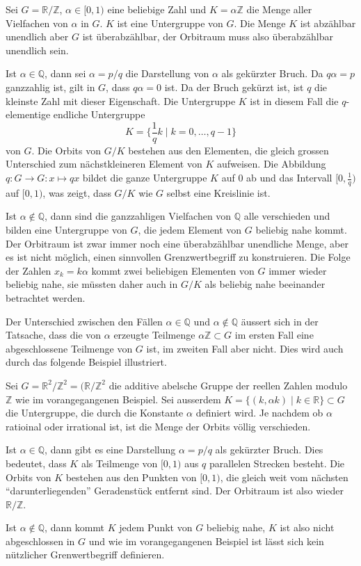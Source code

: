 \begin{beispiel}
Sei $G=\mathbb{R}/\mathbb{Z}$,
$\alpha\in [0,1)$ eine beliebige Zahl und $K=\alpha\mathbb{Z}$
die Menge aller Vielfachen von $\alpha$ in $G$.
$K$ ist eine Untergruppe von $G$.
Die Menge $K$ ist abzählbar unendlich aber $G$ ist überabzählbar,
der Orbitraum muss also überabzählbar unendlich sein.

Ist $\alpha\in\mathbb{Q}$, dann sei $\alpha=p/q$ die Darstellung
von $\alpha$ als gekürzter Bruch.
Da $q\alpha=p$ ganzzahlig ist, gilt in $G$, dass $q\alpha=0$ ist.
Da der Bruch gekürzt ist, ist $q$ die kleinste Zahl mit dieser
Eigenschaft.
Die Untergruppe $K$ ist in diesem Fall die $q$-elementige endliche
Untergruppe
\[
K = \biggl\{ \frac1qk \;\bigg|\; k=0,\dots,q-1 \biggr\}
\]
von $G$.
Die Orbits von $G/K$ bestehen aus den Elementen, die gleich grossen
Unterschied zum nächstkleineren Element von $K$ aufweisen.
Die Abbildung $q\colon G \to G: x\mapsto qx$ bildet die ganze
Untergruppe $K$ auf $0$ ab und das Intervall $[0,\frac1q)$ auf
$[0,1)$, was zeigt, dass $G/K$ wie $G$ selbst eine Kreislinie ist.

Ist $\alpha\not\in \mathbb{Q}$, dann sind die ganzzahligen Vielfachen
von $\mathbb{Q}$ alle verschieden und bilden eine Untergruppe von $G$,
die jedem Element von $G$ beliebig nahe kommt.
Der Orbitraum ist zwar immer noch eine überabzählbar unendliche
Menge, aber es ist nicht möglich, einen sinnvollen Grenzwertbegriff
zu konstruieren.
Die Folge der Zahlen $x_k=k\alpha$ kommt zwei beliebigen Elementen
von $G$ immer wieder beliebig nahe, sie müssten daher auch in $G/K$
als beliebig nahe beeinander betrachtet werden.
\end{beispiel}

Der Unterschied zwischen den Fällen $\alpha\in\mathbb{Q}$ und
$\alpha\not\in\mathbb{Q}$ äussert sich in der Tatsache, dass
die von $\alpha$ erzeugte Teilmenge $\alpha\mathbb{Z}\subset G$ 
im ersten Fall eine abgeschlossene Teilmenge von $G$ ist,
im zweiten Fall aber nicht.
Dies wird auch durch das folgende Beispiel illustriert.

\begin{beispiel}
Sei $G=\mathbb{R}^2/\mathbb{Z}^2 = (\mathbb{R}/\mathbb{Z}^2$ die additive
abelsche Gruppe der reellen Zahlen modulo $\mathbb{Z}$ wie im
vorangegangenen Beispiel.
Sei ausserdem $K=\{(k,\alpha k)\mid k\in\mathbb{R}\}\subset G$
die Untergruppe, die durch die Konstante $\alpha$ definiert wird.
Je nachdem ob $\alpha$ ratioinal oder irrational ist, ist die Menge der
Orbits völlig verschieden.

Ist $\alpha\in\mathbb{Q}$, dann gibt es eine Darstellung $\alpha=p/q$
als gekürzter Bruch.
Dies bedeutet, dass $K$ als Teilmenge von $[0,1)$ aus $q$ parallelen
Strecken besteht.
Die Orbits von $K$ bestehen aus den Punkten von $[0,1)$, die gleich weit
vom nächsten ``darunterliegenden'' Geradenstück entfernt sind.
Der Orbitraum ist also wieder $\mathbb{R}/\mathbb{Z}$.

Ist $\alpha\not\in\mathbb{Q}$, dann kommt $K$ jedem Punkt von $G$ beliebig
nahe, $K$ ist also nicht abgeschlossen in $G$ und wie im vorangegangenen
Beispiel ist lässt sich kein nützlicher Grenwertbegriff definieren.
\end{beispiel}

